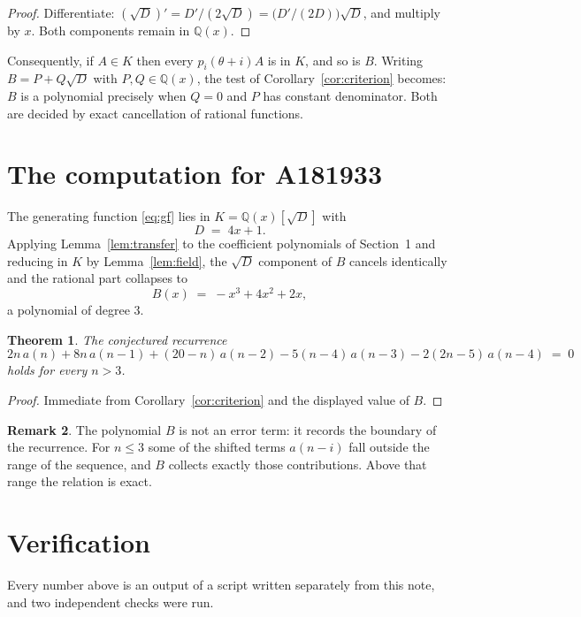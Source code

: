 \documentclass[11pt,a4paper]{article}
\theoremstyle{plain}
\newtheorem{theorem}{Theorem}
\theoremstyle{definition}
\newtheorem{remark}[theorem]{Remark}
\begin{document}
\begin{proof}
Differentiate: $(\sqrt{D})'=D'/(2\sqrt{D})=\bigl(D'/(2D)\bigr)\sqrt{D}$, and multiply by
$x$. Both components remain in $\mathbb{Q}(x)$.
\end{proof}

Consequently, if $A\in K$ then every $p_{i}(\theta+i)A$ is in $K$, and so is $B$. Writing
$B=P+Q\sqrt{D}$ with $P,Q\in\mathbb{Q}(x)$, the test of Corollary~\ref{cor:criterion}
becomes: $B$ is a polynomial precisely when $Q=0$ and $P$ has constant denominator. Both
are decided by exact cancellation of rational functions.

\section{The computation for A181933}

The generating function \eqref{eq:gf} lies in $K=\mathbb{Q}(x)[\sqrt{D}]$ with
\[
D \;=\; 4 x + 1 .
\]
Applying Lemma~\ref{lem:transfer} to the coefficient polynomials of Section~1 and reducing
in $K$ by Lemma~\ref{lem:field}, the $\sqrt{D}$ component of $B$ cancels identically and
the rational part collapses to
\[
B(x)\;=\;- x^{3} + 4 x^{2} + 2 x ,
\]
a polynomial of degree $3$.

\begin{theorem}
The conjectured recurrence
\[
2 n\,a(n) + 8 n\,a(n-1) + (20 - n)\,a(n-2) -  5 \left(n - 4\right)\,a(n-3) -  2 \left(2 n - 5\right)\,a(n-4) \;=\;0
\]
holds for every $n>3$.
\end{theorem}

\begin{proof}
Immediate from Corollary~\ref{cor:criterion} and the displayed value of $B$.
\end{proof}

\begin{remark}
The polynomial $B$ is not an error term: it records the boundary of the recurrence. For
$n\le3$ some of the shifted terms $a(n-i)$ fall outside the range of the sequence,
and $B$ collects exactly those contributions. Above that range the relation is exact.
\end{remark}

\section{Verification}

Every number above is an output of a script written separately from this note, and two
independent checks were run.
\end{document}
